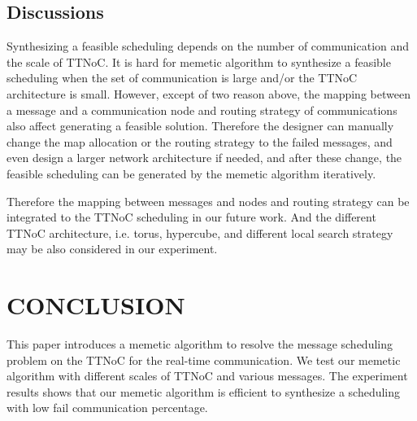 \documentclass[journal]{IEEEtran}
\begin{document}
\subsection{Discussions}

Synthesizing a feasible scheduling depends on the number of communication and the scale of TTNoC. It is hard for memetic algorithm to synthesize a feasible scheduling when the set of communication is large and/or the TTNoC architecture is small. However, except of two reason above, the mapping between a message and a communication node and routing strategy of communications also affect generating a feasible solution. Therefore the designer can manually change the map allocation or the routing strategy to the failed messages, and even design a larger network architecture if needed, and after these change, the feasible scheduling can be generated by the memetic algorithm iteratively. 

Therefore the mapping between messages and nodes and routing strategy can be integrated to the TTNoC scheduling in our future work. And the different TTNoC architecture, i.e. torus, hypercube, and different local search strategy may be also considered in our experiment.

\section{CONCLUSION\label{s:conclud}}

This paper introduces a memetic algorithm to resolve the message scheduling problem on the TTNoC for the real-time communication. We test our memetic algorithm with different scales of TTNoC and various messages. The experiment results shows that our memetic algorithm is efficient to synthesize a scheduling with low fail communication percentage.













\end{document}
